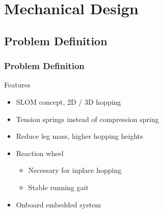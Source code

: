 \section{Mechanical Design}
\subsection*{Problem Definition}
\begin{frame}
\frametitle{Problem Definition}
\begin{block}{Features}
\begin{itemize}
\item
SLOM concept, 2D / 3D hopping\\[0.2in]
\item
Tension springs instead of compression spring\\[0.2in]
\item
Reduce leg mass, higher hopping heights\\[0.2in]
\item
Reaction wheel\\[0.1in]
\begin{itemize}
    \item
    Necessary for inplace hopping\\[0.1in]
    \item
    Stable running gait\\[0.1in]
\end{itemize}
\item
Onboard embedded system
\end{itemize}
\end{block}
\end{frame}

